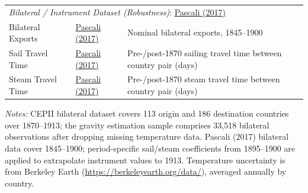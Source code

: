 \documentclass[10pt]{article}
\begin{document}
\begin{table}[!htbp]
\begin{tabular}{p{4.5cm} p{4cm} p{5.5cm}}
\midrule
\multicolumn{3}{l}{\textit{Bilateral / Instrument Dataset (Robustness)}: \href{https://doi.org/10.1257/aer.20140832}{Pascali (2017)}} \\
Bilateral Exports & \href{https://doi.org/10.1257/aer.20140832}{Pascali (2017)} & Nominal bilateral exports, 1845--1900 \\
Sail Travel Time & \href{https://doi.org/10.1257/aer.20140832}{Pascali (2017)} & Pre-/post-1870 sailing travel time between country pair (days) \\
Steam Travel Time & \href{https://doi.org/10.1257/aer.20140832}{Pascali (2017)} & Pre-/post-1870 steam travel time between country pair (days) \\
\bottomrule
\end{tabular}
\begin{minipage}[t]{\textwidth}
\small
\medskip
\textit{Notes:} CEPII bilateral dataset covers 113 origin and 186 destination countries over 1870--1913; the gravity estimation sample comprises 33,518 bilateral observations after dropping missing temperature data. Pascali (2017) bilateral data cover 1845--1900; period-specific sail/steam coefficients from 1895--1900 are applied to extrapolate instrument values to 1913. Temperature uncertainty is from Berkeley Earth (\url{https://berkeleyearth.org/data/}), averaged annually by country.
\end{minipage}
\end{table}
\end{document}
